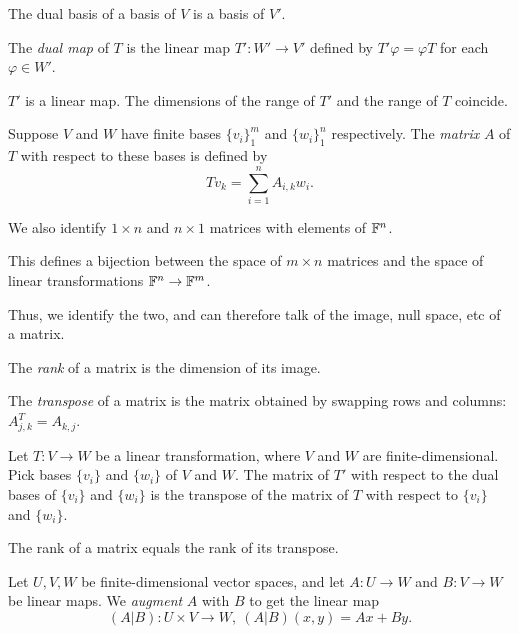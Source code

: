 \begin{prop}
  The dual basis of a basis of $V$ is a basis of $V'$.
\end{prop}
\begin{defn}
  The \emph{dual map} of $T$ is the linear map $T':W'\to V'$ defined by
  $T'\varphi=\varphi T$ for each $\varphi\in W'$.
\end{defn}
\begin{prop}
  $T'$ is a linear map. The dimensions of the range of $T'$ and the range of $T$
  coincide.
\end{prop}
\begin{defn}
  Suppose $V$ and $W$ have finite bases $\{v_i\}_1^m$ and $\{w_i\}_1^n$
  respectively. The \emph{matrix} $A$ of $T$ with respect to these bases is
  defined by
  \[Tv_k=\sum_{i=1}^n A_{i,k}w_i.\]

  We also identify $1\times n$ and $n\times 1$ matrices with elements of
  $\mathbb{F}^n$.
\end{defn}
\begin{prop}
  This defines a bijection between the space of $m\times n$ matrices and the space
  of linear transformations $\mathbb{F}^n\to \mathbb{F}^m$.
\end{prop}
\begin{defn}
  Thus, we identify the two, and can therefore talk of the image, null space,
  etc of a matrix.
\end{defn}
\begin{defn}
  The \emph{rank} of a matrix is the dimension of its image.

  The \emph{transpose} of a matrix is the matrix obtained by swapping rows and
  columns: $A^T_{j,k}=A_{k,j}$.
\end{defn}
\begin{prop}
  Let $T:V\to W$ be a linear transformation, where $V$ and $W$ are
  finite-dimensional. Pick bases $\{v_i\}$ and $\{w_i\}$ 
  of $V$ and $W$. The matrix of $T'$ with respect
  to the dual bases of $\{v_i\}$ and $\{w_i\}$ 
  is the transpose of the matrix of $T$ with respect to $\{v_i\}$ and $\{w_i\}$.
\end{prop}
\begin{cor}
  The rank of a matrix equals the rank of its transpose.
\end{cor}
\begin{defn}
  Let $U,V,W$ be finite-dimensional vector spaces, and let $A:U\to W$ and
  $B:V\to W$ be linear maps. We \emph{augment} $A$ with $B$ to get the linear
  map
  \[(A|B):U\times V\to W,\ (A|B)(x,y)=Ax+By.\]
\end{defn}
